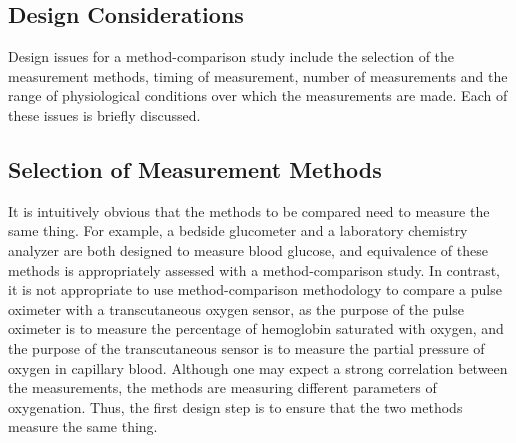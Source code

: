 \documentclass[]{article}
\begin{document}
\subsection*{Design Considerations}

Design issues for a method-comparison study include the selection of the measurement methods, timing of measurement, number of measurements and the range of physiological conditions over which the measurements are made. Each of these issues is briefly discussed.

\subsection*{Selection of Measurement Methods}
It is intuitively obvious that the methods to be compared need to measure the same thing. For example, a bedside glucometer and a laboratory chemistry analyzer are both designed to measure blood glucose, and equivalence of these methods is appropriately assessed with a method-comparison study. In contrast, it is not appropriate to use method-comparison methodology to compare a pulse oximeter with a transcutaneous oxygen sensor, as the purpose of the pulse oximeter is to measure the percentage of hemoglobin saturated with oxygen, and the purpose of the transcutaneous sensor is to measure the partial pressure of oxygen in capillary blood. Although one may expect a strong correlation between the measurements, the methods are measuring different parameters of oxygenation. Thus, the first design step is to ensure that the two methods measure the same thing.
\end{document}
